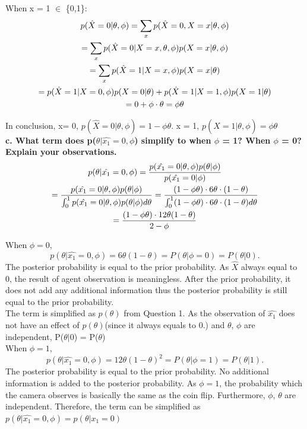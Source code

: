 \documentclass{article}
\begin{document}
When x = 1 $\in$ \{0,1\}:
\begin{gather}
p(\hat{X} = 0|\theta, \phi) = \sum_x{p(\hat{X} = 0, X = x|\theta, \phi) } \notag \\ \notag = \sum_x{p(\hat{X} = 0|X= x,\theta,\phi)p(X=x|\theta,\phi)} \\
= \sum_x {p(\hat{X} = 1| X =x,\phi) p(X= x|\theta)} \notag\\ = p(\hat{X} = 1 | X = 0,\phi)p(X = 0| \theta) + p(\hat{X} = 1 | X = 1,\phi)p(X = 1| \theta) \notag \\ 
= 0 + \phi \cdot \theta =  \phi \theta
\end{gather}

In conclusion, x= 0, $p(\hat{X} = 0|\theta, \phi) = 1 - \phi \theta$. x = 1, $p(\hat{X} = 1|\theta, \phi) =\phi \theta$\\

\textbf{c. What term does p($\theta|\hat{x_1} = 0,\phi$) simplify to when $\phi$ = 1? When $\phi$ = 0? Explain your observations.}\\
\begin{gather}
p(\theta|\hat{x_1} = 0,\phi)=\frac{p(\hat{x_1} =0|\theta,\phi) p(\theta|\phi)}{p(\hat{x_1} = 0|\phi)} \notag\\
= \frac{p(\hat{x_1} =0|\theta,\phi) p(\theta|\phi)}{\int_0^1{p(\hat{x_1} =0|\theta,\phi) p(\theta|\phi)}d\theta} = \frac{(1-\phi \theta)\cdot 6\theta \cdot(1-\theta)}{\int_0^1 (1-\phi \theta)\cdot 6\theta \cdot(1-\theta) d\theta} \notag \\ = \frac{(1-\phi\theta)\cdot 12\theta (1-\theta)}{2-\phi}
\end{gather}

When $\phi = 0$, \[ p(\theta|\hat{x_1} =0,\phi)  = 6\theta(1-\theta) = P(\theta|\phi = 0) = P(\theta|0). \]  The posterior probability is equal to the prior probability. As $\hat{X}$ always equal to 0, the result of agent observation is meaningless. After the prior probability, it does not add any additional information thus the posterior probability is still equal to the prior probability. \\
The term is simplified as $p(\theta)$ from Question 1. As the observation of $\hat{x_1}$ does not have an effect of $p(\theta)$(since it always equals to 0.) and $\theta$, $\phi$ are independent, P($\theta|0$) = P($\theta$) \\

When $\phi = 1$, \[ p(\theta|\hat{x_1} =0,\phi) = 12\theta(1-\theta)^2 = P(\theta|\phi = 1)  = P(\theta|1). \] The posterior probability is equal to the prior probability. No additional information is added to the posterior probability. As $\phi = 1$, the probability which the camera observes is basically the same as the coin flip. Furthermore, $\phi$, $\theta$ are independent. Therefore, the term can be simplified as $p(\theta|\hat{x_1} =0,\phi) = p(\theta|x_1 = 0)$ \\
\end{document}

